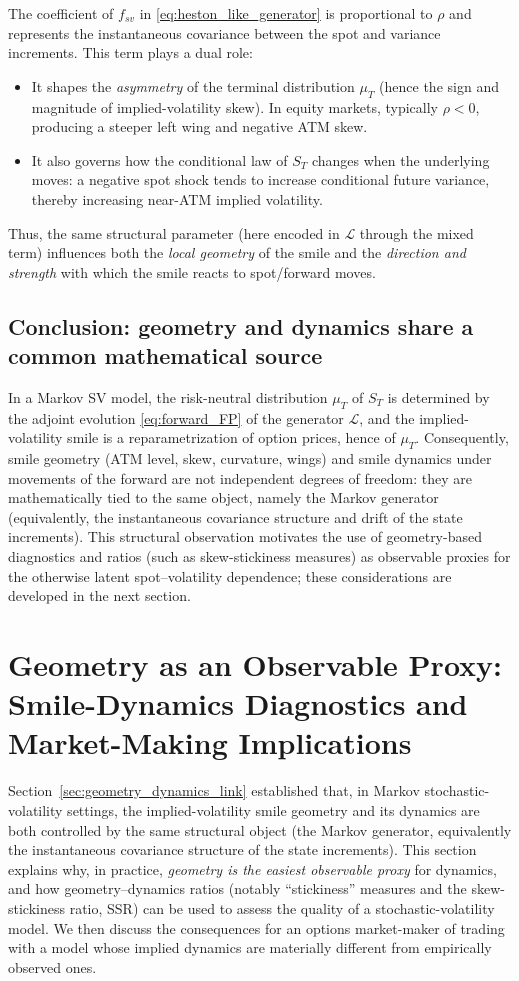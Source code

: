 \documentclass[11pt,a4paper]{report}
\begin{document}
The coefficient of $f_{sv}$ in \eqref{eq:heston_like_generator} is proportional to $\rho$ and represents the instantaneous covariance between the spot and variance increments.
This term plays a dual role:
\begin{itemize}
\item It shapes the \emph{asymmetry} of the terminal distribution $\mu_T$ (hence the sign and magnitude of implied-volatility skew).
In equity markets, typically $\rho<0$, producing a steeper left wing and negative ATM skew.
\item It also governs how the conditional law of $S_T$ changes when the underlying moves: a negative spot shock tends to increase conditional future variance, thereby increasing near-ATM implied volatility.
\end{itemize}
Thus, the same structural parameter (here encoded in $\mathcal{L}$ through the mixed term) influences both the \emph{local geometry} of the smile and the \emph{direction and strength} with which the smile reacts to spot/forward moves.

\subsection{Conclusion: geometry and dynamics share a common mathematical source}
In a Markov SV model, the risk-neutral distribution $\mu_T$ of $S_T$ is determined by the adjoint evolution \eqref{eq:forward_FP} of the generator $\mathcal{L}$, and the implied-volatility smile is a reparametrization of option prices, hence of $\mu_T$.
Consequently, smile geometry (ATM level, skew, curvature, wings) and smile dynamics under movements of the forward are not independent degrees of freedom: they are mathematically tied to the same object, namely the Markov generator (equivalently, the instantaneous covariance structure and drift of the state increments).
This structural observation motivates the use of geometry-based diagnostics and ratios (such as skew-stickiness measures) as observable proxies for the otherwise latent spot--volatility dependence; these considerations are developed in the next section.


\section{Geometry as an Observable Proxy: Smile-Dynamics Diagnostics and Market-Making Implications}\label{sec:geometry_proxy_ssr}

Section~\ref{sec:geometry_dynamics_link} established that, in Markov stochastic-volatility settings, the implied-volatility smile geometry and its dynamics are both controlled by the same structural object (the Markov generator, equivalently the instantaneous covariance structure of the state increments).
This section explains why, in practice, \emph{geometry is the easiest observable proxy} for dynamics, and how geometry--dynamics ratios (notably ``stickiness'' measures and the skew-stickiness ratio, SSR) can be used to assess the quality of a stochastic-volatility model.
We then discuss the consequences for an options market-maker of trading with a model whose implied dynamics are materially different from empirically observed ones.
\end{document}
